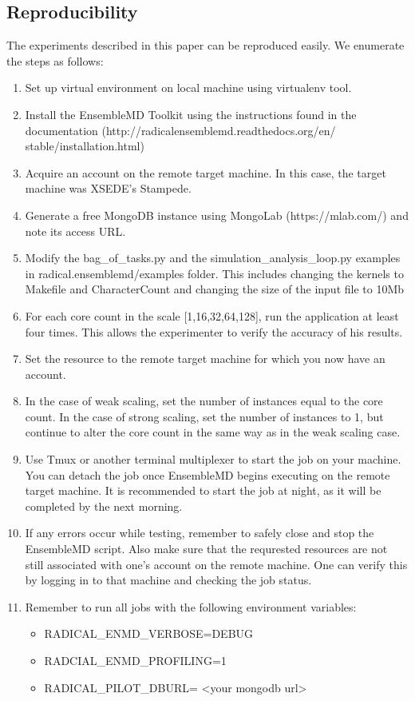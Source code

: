 \documentclass[]{article}
\begin{document}
	\subsection{Reproducibility}
		The experiments described in this paper can be reproduced easily. We enumerate the steps as follows:
		\begin{enumerate}
			\item Set up virtual environment on local machine using virtualenv tool.
			\item Install the EnsembleMD Toolkit using the instructions found in the documentation (http://radicalensemblemd.readthedocs.org/en/ \\ stable/installation.html)
			\item Acquire an account on the remote target machine. In this case, the target machine was XSEDE's Stampede.
			\item Generate a free MongoDB instance using MongoLab (https://mlab.com/) and note its access URL.	
			\item Modify the bag\_of\_tasks.py and the simulation\_analysis\_loop.py examples in radical.ensemblemd/examples folder. This includes changing the kernels to Makefile and CharacterCount and changing the size of the input file to 10Mb
			\item For each core count in the scale [1,16,32,64,128], run the application at least four times. This allows the experimenter to verify the accuracy of his results.
			\item Set the resource to the remote target machine for which you now have an account.
			\item In the case of weak scaling, set the number of instances equal to the core count. In the case of strong scaling, set the number of instances to 1, but continue to alter the core count in the same way as in the weak scaling case.
			\item Use Tmux or another terminal multiplexer to start the job on your machine. You can detach the job once EnsembleMD begins executing on the remote target machine. It is recommended to start the job at night, as it will be completed by the next morning.
			\item If any errors occur while testing, remember to safely close and stop the EnsembleMD script. Also make sure that the requrested resources are not still associated with one's account on the remote machine. One can verify this by logging in to that machine and checking the job status.
			\item Remember to run all jobs with the following environment variables:
				\begin{itemize}
					\item RADICAL\_ENMD\_VERBOSE=DEBUG
					\item RADCIAL\_ENMD\_PROFILING=1
					\item RADICAL\_PILOT\_DBURL= <your mongodb url>
				\end{itemize}
		\end{enumerate}
\end{document}

